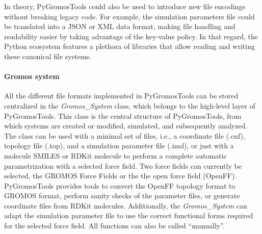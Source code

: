 In theory, PyGromosTools could also be used to introduce new file encodings without breaking legacy code. For example, the simulation parameters file could be translated into a JSON\cite{Pezoa2016} or XML\cite{Bray2008} data format, making file handling and readability easier by taking advantage of the key-value policy. In that regard, the Python ecosystem features a plethora of libraries that allow reading and writing these canonical file systems.


\paragraph{Gromos system}
All the different file formats implemented in PyGromosTools can be stored centralized in the \textit{Gromos\_System} class, which belongs to the high-level layer of PyGromosTools. This class is the central structure of PyGromosTools, from which systems are created or modified, simulated, and subsequently analyzed. The class can be used with a minimal set of files, i.e., a coordinate file (.cnf), topology file (.top), and a simulation parameter file (.imd), or just with a molecule SMILES or RDKit molecule to perform a complete automatic parametrization with a selected force field.
%
Two force fields can currently  be selected, the GROMOS Force Fields or the the open force field (OpenFF).\cite{Qiu2021} PyGromosTools provides tools to convert the OpenFF topology format to GROMOS format, perform sanity checks of the parameter files, or generate coordinate files from RDKit molecules. Additionally, the \textit{Gromos\_System} can adapt the simulation parameter file to use the correct functional forms required for the selected force field.
All functions can also be called ``manually''.

